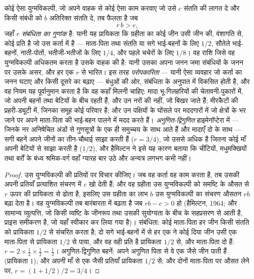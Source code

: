 \begin{theorem}[हैमिल्टन का नियम]\label{thm:b3:behavioural-ecology:hamilton}
कोई ऐसा युग्मविकल्पी, जो अपने वाहक से कोई ऐसा काम करवाए जो उसे $c$
संतति की लागत दे और किसी संबंधी को $b$ अतिरिक्त संतति दे, तब फैलता है जब
\[
r\,b > c ,
\]
जहाँ $r$ \emph{संबंधिता का गुणांक} है: यानी यह प्रायिकता कि ग्रहीता का
कोई जीन उसी जीन की, वंशागति से, कोई प्रति है जो उस कर्ता में है ---
माता-पिता तथा संतति या सगे भाई-बहनों के लिए $1/2$, सौतेले भाई-बहनों,
नाती-पोतों, भतीजी-भतीजों के लिए $1/4$, और पहले चचेरों के लिए $1/8$। वह
राशि जिसे वह युग्मविकल्पी अधिकतम करता है उसके वाहक की \emph{} है: यानी उसका अपना जनन जमा संबंधियों के जनन पर उसके असर, और हर
एक $r$ से भारित। इस तरह \emph{परोपकारिता} --- यानी ऐसा व्यवहार जो कर्ता
का जनन घटाए और किसी दूसरे का बढ़ाए --- बंधुओं की ओर, संबंधिता के
अनुपात में विकसित होती है, और वह नियम यह पूर्वानुमान करता है कि वह कहाँ
मिलनी चाहिए: मादा भू-गिलहरियों की चेतावनी-पुकारों में, जो अपनी बहनों तथा
बेटियों के बीच रहती हैं, और उन नरों की नहीं, जो बिखर जाते हैं;
मीरकैटों की प्रहरी-ड्यूटी में, जिनका समूह कोई परिवार है; और उन पक्षियों
के घोंसले पर मददगारों में जो क्षेत्रों के भर जाने पर अपने माता-पिता की
भाई-बहन पालने में मदद करते हैं। \emph{अगुणित-द्विगुणित} हाइमेनॉप्टेरा
में --- जिनके नर अनिषेचित अंडों से गुणसूत्रों के एक ही समुच्चय के साथ
आते हैं और मादाएँ दो के साथ --- सगी बहनें अपने जीनों का तीन-चौथाई साझा
करती हैं ($r = 3/4$), जो उससे अधिक है जितना कोई माँ अपनी बेटियों से साझा
करती है ($1/2$), और हैमिल्टन ने इसे यह कारण बताया कि चींटियों,
मधुमक्खियों तथा बर्रों के बंध्य श्रमिक-वर्ग वहाँ ग्यारह बार उठे और
अन्यत्र लगभग कभी नहीं।
\end{theorem}
\begin{proof}
उस युग्मविकल्पी की प्रतियों पर विचार कीजिए। जब वह कर्ता वह काम करता है,
तब उसकी अपनी प्रतियाँ प्रत्याशित संचरण में $c$ खो देती हैं; और वह
ग्रहीता उस युग्मविकल्पी को समष्टि के औसत से $r$ ऊपर की प्रायिकता से
ढोता है, इसलिए उस ग्रहीता का लाभ $b$ उस युग्मविकल्पी का संचरण औसतन
$rb$ बढ़ा देता है। वह युग्मविकल्पी तब बारंबारता में बढ़ता है जब
$rb - c > 0$ हो (हैमिल्टन, 1964; और सामान्य व्युत्पत्ति, जो किसी
व्यष्टि के जीनरूप तथा उसकी सुयोग्यता के बीच के सहप्रसरण से आती है, प्राइस
समीकरण है, जो यहाँ स्वीकार कर लिया गया है)। संबंधिता: कोई माता-पिता हर
जीन किसी संतति को प्रायिकता $1/2$ से संचरित करता है; दो सगे भाई-बहनों में
से हर एक ने कोई दिया जीन उसी एक माता-पिता से प्रायिकता $1/2$ से पाया,
और वह वही प्रति है प्रायिकता $1/2$ से, और माता-पिता दो हैं:
$r = 2\times\tfrac{1}{2}
\times\tfrac{1}{2} = \tfrac{1}{2}$। अगुणित-द्विगुणित बहनें: अपने
अगुणित पिता से वे एक जैसे जीन पाती हैं (प्रायिकता $1$); और अपनी माँ से
एक जैसी प्रतियाँ प्रायिकता $1/2$ से; और दोनों माता-पिता पर औसत लेने पर,
$r = (1 + 1/2)/2 = 3/4$।
\end{proof}

